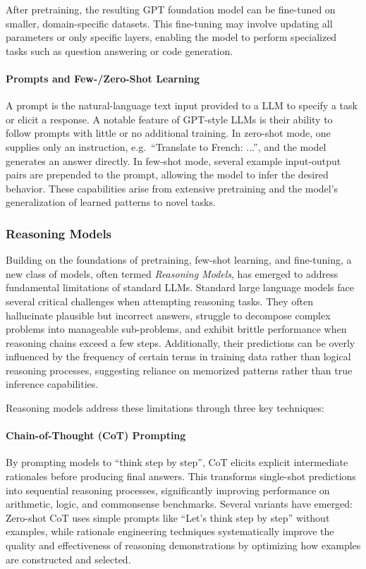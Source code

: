 After pretraining, the resulting GPT foundation model can be fine-tuned on smaller, domain-specific datasets. 
This fine-tuning may involve updating all parameters or only specific layers, enabling the model to perform specialized tasks such as question answering or code generation.

\paragraph{Prompts and Few-/Zero-Shot Learning \cite{gpt3-paper}}  
A prompt is the natural-language text input provided to a LLM to specify a task or elicit a response.
A notable feature of GPT-style LLMs is their ability to follow prompts with little or no additional training.
In zero-shot mode, one supplies only an instruction, e.g.\ \enquote{Translate to French: ...}, and the model generates an answer directly.
In few-shot mode, several example input-output pairs are prepended to the prompt, allowing the model to infer the desired behavior.
These capabilities arise from extensive pretraining and the model's generalization of learned patterns to novel tasks.

\def\sectitle{Reasoning Models}
\subsubsection[\sectitle]{\sectitle{} \cite{reasoning-survey}}
Building on the foundations of pretraining, few-shot learning, and fine-tuning, a new class of models, often termed \emph{Reasoning Models}, has emerged to address fundamental limitations of standard LLMs. 
Standard large language models face several critical challenges when attempting reasoning tasks. 
They often hallucinate plausible but incorrect answers, struggle to decompose complex problems into manageable sub-problems, and exhibit brittle performance when reasoning chains exceed a few steps. 
Additionally, their predictions can be overly influenced by the frequency of certain terms in training data rather than logical reasoning processes, suggesting reliance on memorized patterns rather than true inference capabilities.

Reasoning models address these limitations through three key techniques:

\vspace{-1\baselineskip}
\paragraph{Chain-of-Thought (CoT) Prompting} 
By prompting models to \enquote{think step by step}, CoT elicits explicit intermediate rationales before producing final answers. 
This transforms single-shot predictions into sequential reasoning processes, significantly improving performance on arithmetic, logic, and commonsense benchmarks. 
Several variants have emerged: Zero-shot CoT uses simple prompts like \enquote{Let's think step by step} without examples, while rationale engineering techniques systematically improve the quality and effectiveness of reasoning demonstrations by optimizing how examples are constructed and selected.

